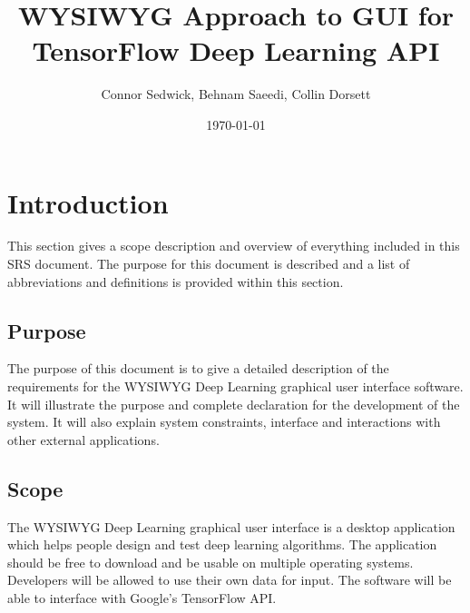 \documentclass[journal,10pt,onecolumn,compsoc]{IEEEtran} \usepackage[margin=1.0in]{geometry} \usepackage{pdfpages} \usepackage{graphicx}
\title{WYSIWYG Approach to GUI for TensorFlow Deep Learning API}
\author{Connor Sedwick, Behnam Saeedi,  Collin Dorsett}
\date{\today}
\begin{document}
\maketitle
\newpage
\tableofcontents
\newpage
\section{Introduction}

This section gives a scope description and overview of everything included in this SRS document. 
The purpose for this document is described and a list of abbreviations and definitions is provided within this section.

\subsection{Purpose}

The purpose of this document is to give a detailed description of the requirements for the WYSIWYG Deep Learning graphical user interface software. It will illustrate the purpose and complete declaration for the development of the system. It will also explain system constraints, interface and interactions with other external applications. 

\subsection{Scope}

The WYSIWYG Deep Learning graphical user interface is a desktop application which helps people design and test deep learning algorithms.
The application should be free to download and be usable on multiple operating systems.
Developers will be allowed to use their own data for input.
The software will be able to interface with Google's TensorFlow API. 
\end{document}
